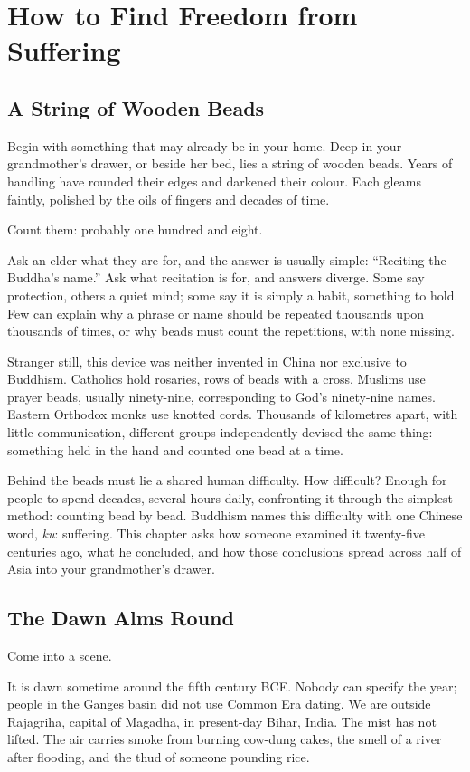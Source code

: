 \chapter{How to Find Freedom from Suffering}
\section{A String of Wooden Beads}
Begin with something that may already be in your home. Deep in your grandmother's drawer, or beside her bed, lies a string of wooden beads. Years of handling have rounded their edges and darkened their colour. Each gleams faintly, polished by the oils of fingers and decades of time.

Count them: probably one hundred and eight.

Ask an elder what they are for, and the answer is usually simple: ``Reciting the Buddha's name.'' Ask what recitation is for, and answers diverge. Some say protection, others a quiet mind; some say it is simply a habit, something to hold. Few can explain why a phrase or name should be repeated thousands upon thousands of times, or why beads must count the repetitions, with none missing.

Stranger still, this device was neither invented in China nor exclusive to Buddhism. Catholics hold rosaries, rows of beads with a cross. Muslims use prayer beads, usually ninety-nine, corresponding to God's ninety-nine names. Eastern Orthodox monks use knotted cords. Thousands of kilometres apart, with little communication, different groups independently devised the same thing: something held in the hand and counted one bead at a time.

Behind the beads must lie a shared human difficulty. How difficult? Enough for people to spend decades, several hours daily, confronting it through the simplest method: counting bead by bead. Buddhism names this difficulty with one Chinese word, \textit{ku}: suffering. This chapter asks how someone examined it twenty-five centuries ago, what he concluded, and how those conclusions spread across half of Asia into your grandmother's drawer.

\section{The Dawn Alms Round}
Come into a scene.

It is dawn sometime around the fifth century BCE. Nobody can specify the year; people in the Ganges basin did not use Common Era dating. We are outside Rajagriha, capital of Magadha, in present-day Bihar, India. The mist has not lifted. The air carries smoke from burning cow-dung cakes, the smell of a river after flooding, and the thud of someone pounding rice.

